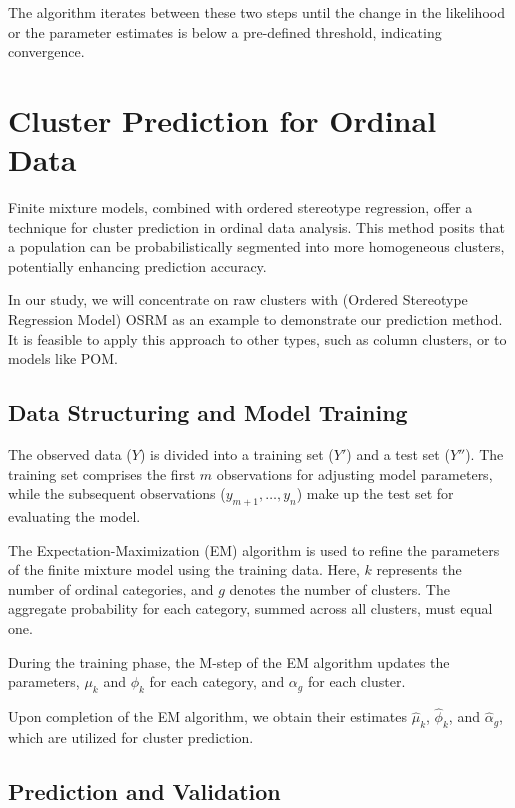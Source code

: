\documentclass{article}
\begin{document}
The algorithm iterates between these two steps until the change in the likelihood or the parameter estimates is below a pre-defined threshold, indicating convergence.




\section{Cluster Prediction for Ordinal Data}

Finite mixture models, combined with ordered stereotype regression, offer a technique for cluster prediction in ordinal data analysis. This method posits that a population can be probabilistically segmented into more homogeneous clusters, potentially enhancing prediction accuracy.

In our study, we will concentrate on raw clusters with (Ordered Stereotype Regression Model) OSRM as an example to demonstrate our prediction method. It is feasible to apply this approach to other types, such as column clusters, or to models like POM.

\subsection{Data Structuring and Model Training}

The observed data ($Y$) is divided into a training set ($Y'$) and a test set ($Y''$). The training set comprises the first $m$ observations for adjusting model parameters, while the subsequent observations ($y_{m+1}, \dots, y_n$) make up the test set for evaluating the model.

The Expectation-Maximization (EM) algorithm is used to refine the parameters of the finite mixture model using the training data. Here, $k$ represents the number of ordinal categories, and $g$ denotes the number of clusters. The aggregate probability for each category, summed across all clusters, must equal one.

During the training phase, the M-step of the EM algorithm updates the parameters, $\mu_k$ and $\phi_k$ for each category, and $\alpha_g$ for each cluster.

Upon completion of the EM algorithm, we obtain their estimates $\hat{\mu}_k$, $\hat{\phi}_k$, and $\hat{\alpha}_g$, which are utilized for cluster prediction.

\subsection{Prediction and Validation}
\end{document}
